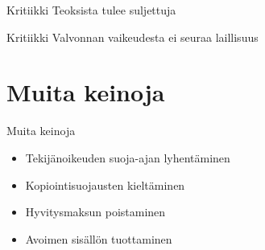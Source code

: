 \documentclass{beamer}
\begin{document}
\begin{frame}{Kritiikki}
  \Large
  Teoksista tulee suljettuja
\end{frame}

\begin{frame}{Kritiikki}
  \Large
  Valvonnan vaikeudesta ei seuraa laillisuus
\end{frame}

\section{Muita keinoja}

\begin{frame}{Muita keinoja}
  \Large
  \begin{itemize}
  \item Tekijänoikeuden suoja-ajan lyhentäminen
  \item Kopiointisuojausten kieltäminen
  \item Hyvitysmaksun poistaminen
  \item Avoimen sisällön tuottaminen
  \end{itemize}
\end{frame}
\end{document}
